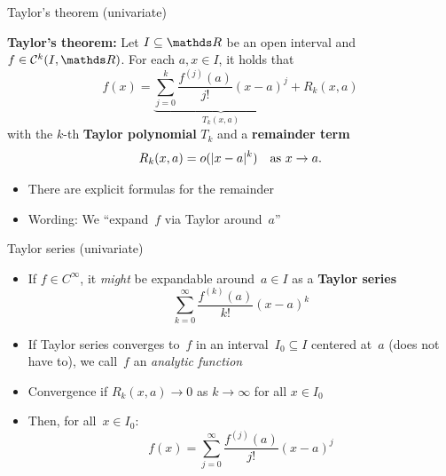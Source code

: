 \documentclass[11pt,compress,t,notes=noshow, xcolor=table]{beamer}
\begin{document}
\begin{vbframe}{Taylor's theorem (univariate)}

\begin{kframe}
    \textbf{Taylor's theorem:} Let $I \subseteq \R$ be an open interval and $f \in \mathcal{C}^k(I,\R)$.
    For each $a,x \in I$, it holds that
    \begin{equation*}
        f(x) = \underbrace{\sum_{j=0}^{k} \frac{f^{(j)}(a)}{j!}(x-a)^{j}}_{T_k(x,a)} + R_k(x,a)
    \end{equation*}
    with the $k$-th \textbf{Taylor polynomial} $T_{k}$ and a \textbf{remainder term}
    \begin{equation*}
        R_k(x, a) = {o}(|x-a|^k) \quad\textnormal{as~$x \to a$}.
    \end{equation*}
\end{kframe}

\begin{itemize}
    \item There are explicit formulas for the remainder
    \item Wording: We \enquote{expand~$f$ via Taylor around~$a$}
\end{itemize}

\end{vbframe}

\begin{vbframe}{Taylor series (univariate)}

\begin{itemize}
    \item If $f \in C^\infty$, it \textit{might} be expandable around~$a \in I$ as a \textbf{Taylor series}
        \begin{equation*}
            \sum_{k=0}^{\infty} \frac{f^{(k)}(a)}{k!}(x-a)^{k}
        \end{equation*}
    \item If Taylor series converges to~$f$ in an interval~$I_0 \subseteq I$ centered at~$a$ (does not have to), we call~$f$ an \textit{analytic function}
    \item Convergence if $R_k(x, a) \rightarrow 0$ as $k \rightarrow \infty$ for all $x \in I_0$
    \item Then, for all~$x \in I_0$:
        \begin{equation*}
            f(x) = \sum_{j=0}^{\infty} \frac{f^{(j)}(a)}{j!}(x-a)^{j}
        \end{equation*}
\end{itemize}

\end{vbframe}
\end{document}
